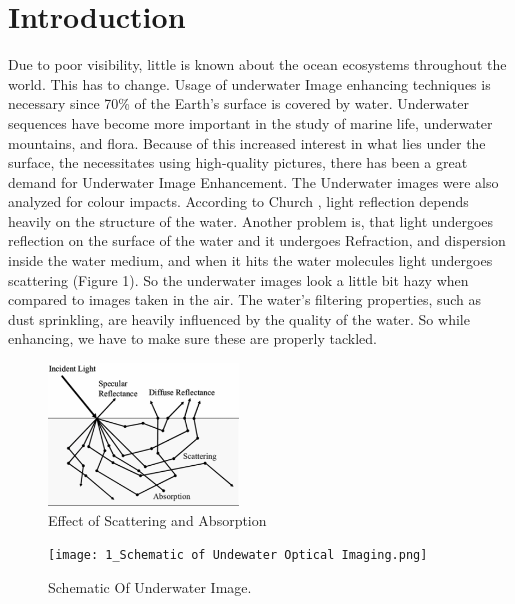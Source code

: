 \documentclass[conference]{IEEEtran}
\begin{document}
\section{Introduction}
Due to poor visibility, little is known about the ocean ecosystems throughout the world. This has to change. Usage of underwater Image enhancing techniques is necessary since 70\% of the Earth's surface is covered by water. Underwater sequences have become more important in the study of marine life, underwater mountains, and flora. Because of this increased interest in what lies under the surface, the necessitates using high-quality pictures, there has been a great demand for Underwater Image Enhancement. The Underwater images were also analyzed for colour impacts. According to Church \cite{WHITE2003693}, light reflection depends heavily on the structure of the water. Another problem is, that light undergoes reflection on the surface of the water and it undergoes Refraction, and dispersion inside the water medium, and when it hits the water molecules light undergoes scattering (Figure 1). So the underwater images look a little bit hazy when compared to images taken in the air. The water's filtering properties, such as dust sprinkling, are heavily influenced by the quality of the water. So while enhancing, we have to make sure these are properly tackled.\\
\begin{figure}
\centering
\includegraphics[width=0.45\textwidth]{3_Effect of Scattering and Absorption.png}
\caption{Effect of Scattering and Absorption}
\end{figure}

\begin{figure}
\centering
\texttt{[image: 1\_Schematic of Undewater Optical Imaging.png]}
\caption{Schematic Of Underwater Image.}
\end{figure}
\end{document}
